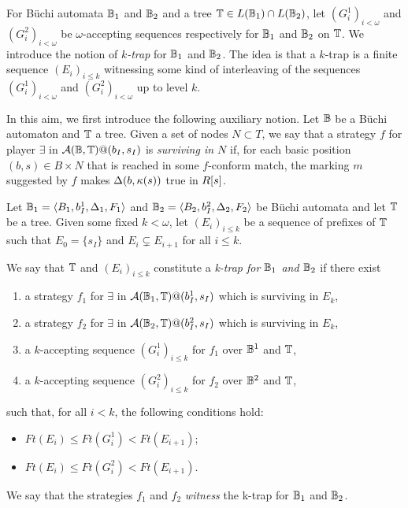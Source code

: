 For B\"{u}chi automata $\mathbb{B}_1$ and $\mathbb{B}_2$ and a tree
$\mathbb{T} \in L(\mathbb{B}_1)\cap L(\mathbb{B}_2)$, let $(G^1_i)_{i<\omega}$ and
$(G^2_i)_{i<\omega}$ be $\omega$-accepting sequences respectively for $\mathbb{B}_1$
and $\mathbb{B}_2$ on $\mathbb{T}$. We introduce the notion of \emph{$k$-trap} for
$\mathbb{B}_1$ and $\mathbb{B}_2$. The idea is that a $k$-trap is a finite sequence
$(E_i)_{i\leq k}$ witnessing some kind of interleaving of the sequences
$(G^1_i)_{i<\omega}$ and $(G^2_i)_{i<\omega}$ up to level $k$.

In this aim, we first introduce the following auxiliary notion. Let $\mathbb{B}$ be a B\"{u}chi automaton and $\mathbb{T}$ a tree. Given a set of nodes $N \subset T$, we say that a strategy $f$ for player $\exists$ in $\mathcal{A}(\mathbb{B},\mathbb{T})@(b_I,s_I)$ is \emph{surviving in $N$} if, for each basic position $(b,s) \in B\times N$ that is reached in some $f$-conform match, the marking $m$ suggested by $f$ makes $\Delta(b,\kappa(s))$ true in $R[s]$.

\begin{definition}\label{DEF_Rabin_trap}
Let $\mathbb{B}_1 = \langle B_1,b_I^1,\Delta_1,F_1\rangle$ and
$\mathbb{B}_2= \langle B_2,b_I^2,\Delta_2,F_2\rangle$ be B\"{u}chi automata and
let $\mathbb{T}$ be a tree.
Given some fixed $k < \omega$, let $(E_i)_{i\leq k}$ be a sequence of prefixes
of $\mathbb{T}$ such that $E_0 = \{s_I\}$ and $E_i \varsubsetneq E_{i+1}$ for
all $i \leq k$.

We say that $\mathbb{T}$ and $(E_i)_{i\leq k}$ constitute a \emph{k-trap for
$\mathbb{B}_1$ and $\mathbb{B}_2$} if there exist
\begin{enumerate}
  \item a strategy $f_1$ for $\exists$ in $\mathcal{A}(\mathbb{B}_1,\mathbb{T})@(b_I^1,s_I)$
  which is surviving in $E_k$,
  \item a strategy $f_2$ for $\exists$ in $\mathcal{A}(\mathbb{B}_2,\mathbb{T})@(b_I^2,s_I)$ which is surviving in $E_k$,
  \item a $k$-accepting sequence $(G_i^1)_{i\leq k}$ for $f_1$ over $\mathbb{B}^1$ and $\mathbb{T}$,
  \item a $k$-accepting sequence $(G_i^2)_{i\leq k}$ for $f_2$ over $\mathbb{B}^2$ and $\mathbb{T}$,
\end{enumerate}
such that, for all $i < k$, the following conditions hold:
\begin{itemize}
  \item $\mathit{Ft}(E_i) \leq \mathit{Ft}(G^1_i) < \mathit{Ft}(E_{i+1})$;
  \item $\mathit{Ft}(E_i) \leq \mathit{Ft}(G^2_i) < \mathit{Ft}(E_{i+1})$.
\end{itemize}
We say that the strategies $f_1$ and $f_2$ \emph{witness} the k-trap for $\mathbb{B}_1$ and $\mathbb{B}_2$.
\end{definition}

